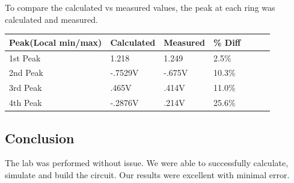\documentclass[11pt]{article}
\begin{document}
	To compare the calculated vs measured values, the peak at each ring was calculated and measured.
	\begin{table}[H]
		\def\arraystretch{1.2}%
		\centering
		\begin{tabular}{|l|l|l|l|l|l|l|}
			\hline
			Peak(Local min/max)		& Calculated 		& Measured			& \% Diff			\\ \hline
			1st Peak				& 1.218				& 1.249				&2.5\%				\\ \hline
			2nd Peak				& -.7529V			& -.675V			&10.3\%				\\ \hline
			3rd Peak				& .465V				& .414V				&11.0\%				\\ \hline
			4th Peak				& -.2876V			& .214V				&25.6\%				\\ \hline
		\end{tabular}
	\end{table}	
	
	\subsection*{Conclusion}
	The lab was performed without issue. We were able to successfully calculate, simulate and build the circuit. Our results were excellent with minimal error.   
	
	
\end{document}
